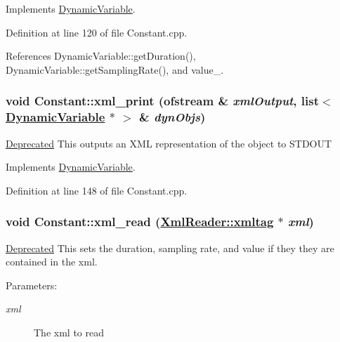 Implements \hyperlink{classDynamicVariable_a12}{Dynamic\-Variable}.

Definition at line 120 of file Constant.cpp.

References Dynamic\-Variable::get\-Duration(), Dynamic\-Variable::get\-Sampling\-Rate(), and value\_\-.\hypertarget{classConstant_a7}{
\subsubsection[xml\_\-print]{\setlength{\rightskip}{0pt plus 5cm}void Constant::xml\_\-print (ofstream \& {\em xml\-Output}, list$<$ \hyperlink{classDynamicVariable}{Dynamic\-Variable} $\ast$ $>$ \& {\em dyn\-Objs})}}
\label{classConstant_a7}


\begin{Desc}
\item[\hyperlink{deprecated__deprecated000004}{Deprecated}]This outputs an XML representation of the object to STDOUT \end{Desc}


Implements \hyperlink{classDynamicVariable_a11}{Dynamic\-Variable}.

Definition at line 148 of file Constant.cpp.\hypertarget{classConstant_a9}{
\subsubsection[xml\_\-read]{\setlength{\rightskip}{0pt plus 5cm}void Constant::xml\_\-read (\hyperlink{classXmlReader_1_1xmltag}{Xml\-Reader::xmltag} $\ast$ {\em xml})}}
\label{classConstant_a9}


\begin{Desc}
\item[\hyperlink{deprecated__deprecated000006}{Deprecated}]This sets the duration, sampling rate, and value if they they are contained in the xml.\end{Desc}
\begin{Desc}
\item[Parameters:]
\begin{description}
\item[{\em xml}]The xml to read \end{description}
\end{Desc}


